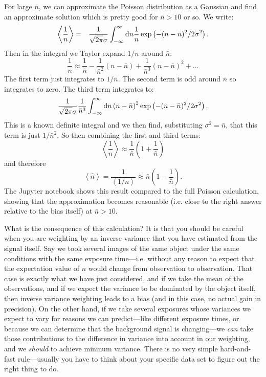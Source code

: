 \begin{enumerate}
\begin{answer}
For large $\bar n$, we can approximate the Poisson distribution as a
Gaussian and find an approximate solution which is pretty good for
$\bar n>10$ or so. We write:
\begin{eqnarray}
\left\langle \frac{1}{n} \right\rangle
&=& \frac{1}{\sqrt{2\pi} \sigma} \int_{-\infty}^{\infty} {\rm
d}n \frac{1}{n} \exp\left(- (n - {\bar n})^2 / 2\sigma^2\right).
\end{eqnarray}
Then in the integral we Taylor expand $1/n$ around $\bar n$:
\begin{equation}
\frac{1}{n} \approx \frac{1}{\bar n}
- \frac{1}{{\bar n}^2}\left(n - {\bar n}\right)
+ \frac{1}{{\bar n}^3}\left(n - {\bar n}\right)^2 + \ldots
\end{equation}
The first term just integrates to $1/{\bar n}$. The second term is odd
around ${\bar n}$ so integrates to zero. The third term integrates to:
\begin{equation}
\frac{1}{\sqrt{2\pi} \sigma} \frac{1}{{\bar n}^3} 
\int_{-\infty}^{\infty} {\rm d}n \left(n - {\bar
n}\right)^2 \exp\left(- (n - {\bar n})^2 / 2\sigma^2\right).
\end{equation}
This is a known definite integral and we then find, substituting
$\sigma^2 = {\bar n}$, that this term is just $1/{\bar n}^2$. So then
combining the first and third terms:
\begin{equation}
\left\langle \frac{1}{n} \right\rangle \approx \frac{1}{\bar
n} \left(1 + \frac{1}{\bar n}\right)
\end{equation}
and therefore
\begin{equation}
\left\langle {\hat n} \right\rangle
= \frac{1}{\left\langle 1/n\right\rangle} \approx {\bar n}
\left(1 - \frac{1}{\bar n}\right).
\end{equation}
The Jupyter notebook shows this result compared to the full Poisson
calculation, showing that the approximation becomes reasonable
(i.e. close to the right answer relative to the bias itself) at ${\bar
n} > 10$.

What is the consequence of this calculation? It is that you should be
careful when you are weighting by an inverse variance that you have
estimated from the signal itself. Say we took several images of the
same object under the same conditions with the same exposure
time---i.e. without any reason to expect that the expectation value of
$n$ would change from observation to observation. That case is exactly
what we have just considered, and if we take the mean of the
observations, and if we expect the variance to be dominated by the
object itself, then inverse variance weighting leads to a bias (and
in this case, no actual gain in precision).
On the other hand, if we
take several exposures whose variances we expect to vary for reasons
we can predict---like different exposure times, or because we can
determine that the background signal is changing---we {\it can} 
take those contributions to the difference in variance into account
in our weighting, and we {\it should} to achieve mininum variance.
There is no very simple hard-and-fast rule---usually you have to think
about your specific data set to figure out the right thing to do.
\end{answer}
\end{enumerate}

